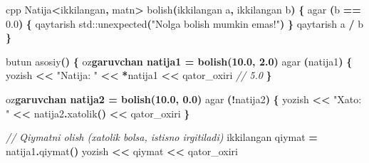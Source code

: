 \documentclass[a4paper,11pt,twoside,openright]{book}
\newenvironment{Shaded}{\begin{snugshade}}{\end{snugshade}}
\newcommand{\BuiltInTok}[1]{#1}
\newcommand{\CharTok}[1]{\textcolor[rgb]{0.31,0.60,0.02}{#1}}
\newcommand{\CommentTok}[1]{\textcolor[rgb]{0.56,0.35,0.01}{\textit{#1}}}
\newcommand{\ErrorTok}[1]{\textcolor[rgb]{0.64,0.00,0.00}{\textbf{#1}}}
\newcommand{\FloatTok}[1]{\textcolor[rgb]{0.00,0.00,0.81}{#1}}
\newcommand{\NormalTok}[1]{#1}
\newcommand{\OperatorTok}[1]{\textcolor[rgb]{0.81,0.36,0.00}{\textbf{#1}}}
\newcommand{\StringTok}[1]{\textcolor[rgb]{0.31,0.60,0.02}{#1}}
\begin{document}
\begin{Shaded}
\begin{Highlighting}[]
\ErrorTok{\textasciigrave{}\textasciigrave{}\textasciigrave{}}\NormalTok{cpp}
\NormalTok{Natija}\OperatorTok{\textless{}}\NormalTok{ikkilangan}\OperatorTok{,}\NormalTok{ matn}\OperatorTok{\textgreater{}}\NormalTok{ bolish}\OperatorTok{(}\NormalTok{ikkilangan a}\OperatorTok{,}\NormalTok{ ikkilangan b}\OperatorTok{)} \OperatorTok{\{}
\NormalTok{    agar }\OperatorTok{(}\NormalTok{b }\OperatorTok{==} \FloatTok{0.0}\OperatorTok{)} \OperatorTok{\{}
\NormalTok{        qaytarish }\BuiltInTok{std::}\NormalTok{unexpected}\OperatorTok{(}\StringTok{"Nolga bo\textquotesingle{}lish mumkin emas!"}\OperatorTok{)}
    \OperatorTok{\}}
\NormalTok{    qaytarish a }\OperatorTok{/}\NormalTok{ b}
\OperatorTok{\}}

\NormalTok{butun asosiy}\OperatorTok{()} \OperatorTok{\{}
\NormalTok{    o}\CharTok{\textquotesingle{}z}\ErrorTok{garuvchan natija1 = bolish(10.0, 2.0)}
\NormalTok{    agar }\OperatorTok{(}\NormalTok{natija1}\OperatorTok{)} \OperatorTok{\{}
\NormalTok{        yozish }\OperatorTok{\textless{}\textless{}} \StringTok{"Natija: "} \OperatorTok{\textless{}\textless{}} \OperatorTok{*}\NormalTok{natija1 }\OperatorTok{\textless{}\textless{}}\NormalTok{ qator\_oxiri   }\CommentTok{// 5.0}
    \OperatorTok{\}}

\NormalTok{    o}\CharTok{\textquotesingle{}z}\ErrorTok{garuvchan natija2 = bolish(10.0, 0.0)}
\NormalTok{    agar }\OperatorTok{(!}\NormalTok{natija2}\OperatorTok{)} \OperatorTok{\{}
\NormalTok{        yozish }\OperatorTok{\textless{}\textless{}} \StringTok{"Xato: "} \OperatorTok{\textless{}\textless{}}\NormalTok{ natija2}\OperatorTok{.}\NormalTok{xatolik}\OperatorTok{()} \OperatorTok{\textless{}\textless{}}\NormalTok{ qator\_oxiri}
    \OperatorTok{\}}

    \CommentTok{// Qiymatni olish (xatolik bo\textquotesingle{}lsa, istisno irgitiladi)}
\NormalTok{    ikkilangan qiymat }\OperatorTok{=}\NormalTok{ natija1}\OperatorTok{.}\NormalTok{qiymat}\OperatorTok{()}
\NormalTok{    yozish }\OperatorTok{\textless{}\textless{}}\NormalTok{ qiymat }\OperatorTok{\textless{}\textless{}}\NormalTok{ qator\_oxiri}


\end{Highlighting}
\end{Shaded}
\end{document}
